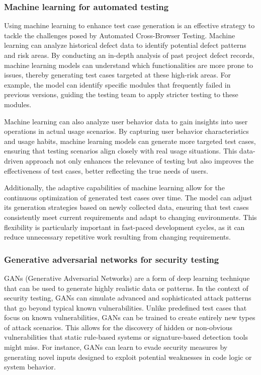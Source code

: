 \documentclass[a4paper, 11pt]{article}  %
\begin{document}
\subsubsection{Machine learning for automated testing}
\vspace{0.25cm} %
Using machine learning to enhance test case generation is an effective strategy to tackle the challenges posed by Automated Cross-Browser Testing. Machine learning can analyze historical defect data to identify potential defect patterns and risk areas. By conducting an in-depth analysis of past project defect records, machine learning models can understand which functionalities are more prone to issues, thereby generating test cases targeted at these high-risk areas. For example, the model can identify specific modules that frequently failed in previous versions, guiding the testing team to apply stricter testing to these modules.

Machine learning can also analyze user behavior data to gain insights into user operations in actual usage scenarios. By capturing user behavior characteristics and usage habits, machine learning models can generate more targeted test cases, ensuring that testing scenarios align closely with real usage situations\cite{chen2004web}. This data-driven approach not only enhances the relevance of testing but also improves the effectiveness of test cases, better reflecting the true needs of users.

Additionally, the adaptive capabilities of machine learning allow for the continuous optimization of generated test cases over time. The model can adjust its generation strategies based on newly collected data, ensuring that test cases consistently meet current requirements and adapt to changing environments. This flexibility is particularly important in fast-paced development cycles, as it can reduce unnecessary repetitive work resulting from changing requirements.
\subsubsection{Generative adversarial networks for security testing}
\vspace{0.25cm} %
GANs (Generative Adversarial Networks) are a form of deep learning technique that can be used to generate highly realistic data or patterns. In the context of security testing, GANs can simulate advanced and sophisticated attack patterns that go beyond typical known vulnerabilities. Unlike predefined test cases that focus on known vulnerabilities, GANs can be trained to create entirely new types of attack scenarios. This allows for the discovery of hidden or non-obvious vulnerabilities that static rule-based systems or signature-based detection tools might miss. For instance, GANs can learn to evade security measures by generating novel inputs designed to exploit potential weaknesses in code logic or system behavior.
   
\end{document}
